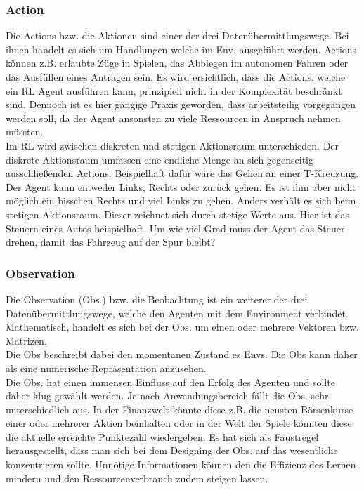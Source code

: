 \subsubsection{Action}\label{sec:Action}
Die Actions bzw. die Aktionen sind einer der drei Datenübermittlungswege. Bei ihnen handelt es sich um Handlungen welche im Env. ausgeführt werden. Actions können z.B. erlaubte Züge in Spielen, das Abbiegen im autonomen Fahren oder das Ausfüllen eines Antragen sein. Es wird ersichtlich, dass die Actions, welche ein RL Agent ausführen kann, prinzipiell nicht in der Komplexität beschränkt sind. 
Dennoch ist es hier gängige Praxis geworden, dass arbeitsteilig vorgegangen werden soll, da der Agent ansonsten zu viele Ressourcen in Anspruch nehmen müssten.\\
Im RL wird zwischen diskreten und stetigen Aktionsraum unterschieden. Der diskrete Aktionsraum umfassen eine endliche Menge an sich gegenseitig ausschließenden Actions. Beispielhaft dafür wäre das Gehen an einer T-Kreuzung. Der Agent kann entweder Links, Rechts oder zurück gehen. Es ist ihm aber nicht möglich ein bisschen Rechts und viel Links zu gehen.
Anders verhält es sich beim stetigen Aktionsraum. Dieser zeichnet sich durch stetige Werte aus. Hier ist das Steuern eines Autos beispielhaft. Um wie viel Grad muss der Agent das Steuer drehen, damit das Fahrzeug auf der Spur bleibt? \cite[S. 31 f.]{DRL_Lapan}

\subsubsection{Observation}\label{sec:Observation}
Die Observation (Obs.) bzw. die Beobachtung ist ein weiterer der drei Datenübermittlungswege, welche den Agenten mit dem Environment verbindet. Mathematisch, handelt es sich bei der Obs. um einen oder mehrere Vektoren bzw. Matrizen.\\
Die Obs beschreibt dabei den momentanen Zustand es Envs. Die Obs kann daher als eine numerische Repräsentation anzusehen. 
\cite[S. 381]{Sutton1998}\\
Die Obs. hat einen immensen Einfluss auf den Erfolg des Agenten und sollte daher klug gewählt werden.
Je nach Anwendungsbereich fällt die Obs. sehr unterschiedlich aus. In der Finanzwelt könnte diese z.B. die neusten Börsenkurse einer oder mehrerer Aktien beinhalten oder in der Welt der Spiele könnten diese die aktuelle erreichte Punktezahl wiedergeben. \cite[S. 32]{DRL_Lapan}
Es hat sich als Faustregel herausgestellt, dass man sich bei dem Designing der Obs. auf das wesentliche konzentrieren sollte. Unnötige Informationen können den die Effizienz des Lernen mindern und den Ressourcenverbrauch zudem steigen lassen.

